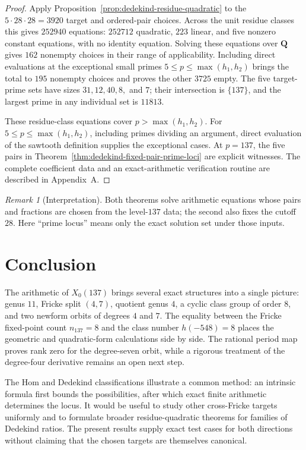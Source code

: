 \documentclass[11pt]{article}
\theoremstyle{definition}
\theoremstyle{remark}
\newtheorem{remark}[theorem]{Remark}
\newcommand{\Q}{\mathbf{Q}}
\begin{document}
\begin{proof}
Apply Proposition~\ref{prop:dedekind-residue-quadratic} to the
$5\cdot28\cdot28=3920$ target and ordered-pair choices.  Across the unit
residue classes this gives $252940$ equations: $252712$ quadratic, $223$
linear, and five nonzero constant equations, with no identity equation.
Solving these equations over $\Q$ gives $162$ nonempty choices in their
range of applicability.  Including direct evaluations at the exceptional
small primes $5\leq p\leq\max(h_1,h_2)$ brings the total to $195$
nonempty choices and proves the other $3725$ empty.
The five target-prime sets have sizes $31,12,40,8,$ and $7$;
their intersection is $\{137\}$, and the largest prime in any individual set
is $11813$.

These residue-class equations cover $p>\max(h_1,h_2)$.  For
$5\leq p\leq\max(h_1,h_2)$, including primes dividing an argument, direct
evaluation of the sawtooth definition supplies the exceptional cases.  At
$p=137$, the five pairs in
Theorem~\ref{thm:dedekind-fixed-pair-prime-loci} are explicit witnesses.  The
complete coefficient data and an exact-arithmetic verification routine are
described in Appendix~A.
\end{proof}

\begin{remark}[Interpretation]
Both theorems solve arithmetic equations whose pairs and fractions are
chosen from the level-$137$ data; the second also fixes the cutoff $28$.
Here ``prime locus''
means only the exact solution set under those inputs.
\end{remark}

\section{Conclusion}

The arithmetic of $X_0(137)$ brings several exact structures into a single
picture: genus $11$, Fricke split $(4,7)$, quotient genus $4$, a cyclic
class group of order $8$, and two newform orbits of degrees $4$ and $7$.  The
equality between the Fricke fixed-point count $n_{137}=8$ and the class number
$h(-548)=8$ places the geometric and quadratic-form calculations side by
side.  The rational period map proves rank zero for the degree-seven orbit,
while a rigorous treatment of the degree-four derivative remains an open
next step.

The Hom and Dedekind classifications illustrate a common method: an intrinsic
formula first bounds the possibilities, after which exact finite arithmetic
determines the locus.  It would be useful to study other cross-Fricke targets
uniformly and to formulate broader residue-quadratic theorems for families of
Dedekind ratios.  The present results supply exact test cases for both
directions without claiming that the chosen targets are themselves canonical.
\end{document}
